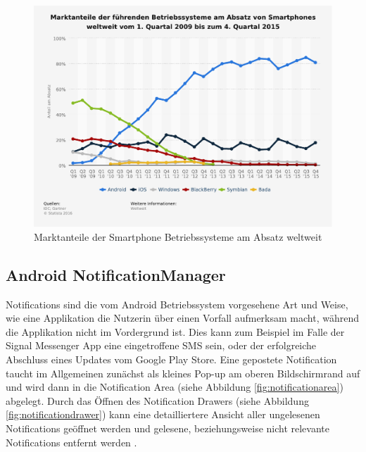\begin{figure}[h]
    \centering
    \includegraphics[width=\textwidth]{images/statistic_id73662_marktanteile-der-smartphone-betriebssysteme-am-absatz-weltweit-bis-q4-2015.pdf}
    \caption{Marktanteile der Smartphone Betriebssysteme am Absatz weltweit\cite{smartphonemarktanteil}}
    \label{fig:marktanteil}
\end{figure}


\subsection {Android NotificationManager}

Notifications sind die vom Android Betriebssystem vorgesehene Art und Weise, 
wie eine Applikation die Nutzerin über einen Vorfall aufmerksam macht, während die Applikation nicht im Vordergrund ist.
Dies kann zum Beispiel im Falle der Signal Messenger App eine eingetroffene SMS sein,
oder der erfolgreiche Abschluss eines Updates vom Google Play Store.
Eine gepostete Notification taucht im Allgemeinen zunächst als kleines Pop-up am oberen Bildschirmrand auf und wird dann in die 
Notification Area (siehe Abbildung \ref{fig:notificationarea}) abgelegt.
Durch das Öffnen des Notification Drawers (siehe Abbildung \ref{fig:notificationdrawer}) kann eine detailliertere Ansicht aller ungelesenen Notifications geöffnet werden und gelesene, beziehungsweise nicht relevante Notifications entfernt werden 
\cite{androidnotification}.


